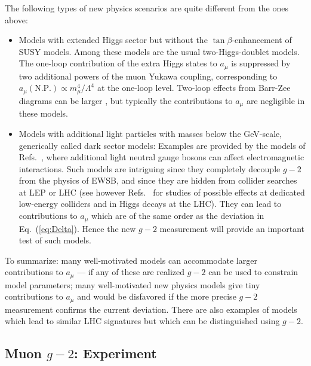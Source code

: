 %
The following types of new physics scenarios are quite different from
the ones above:
\begin{itemize}
\item Models with extended Higgs sector but without the
  $\tan\beta$-enhancement of SUSY models. Among these models are the
  usual two-Higgs-doublet models. The one-loop contribution
  of the extra Higgs states to $a_\mu$ is suppressed by two additional powers of
  the muon Yukawa coupling, corresponding to $a_\mu(\mbox{N.P.})\propto
  m_\mu^4/\Lambda^4$ at the one-loop level. Two-loop effects from
  Barr-Zee diagrams can be larger \cite{Krawczyk:2002df}, but typically the
  contributions to   $a_\mu$ are negligible in these models.
\item Models with additional light particles with masses below the
  GeV-scale, generically called dark sector models: Examples are
  provided by the  models of   Refs.\
  \cite{Pospelov:2008zw,Davoudiasl:2012qa}, where additional light
  neutral gauge bosons can affect electromagnetic interactions. Such
  models are intriguing since 
  they completely decouple $g-2$ from the physics of EWSB, and since
  they are hidden from collider searches at LEP or LHC (see however
  Refs.\ \cite{Essig:2009nc,Davoudiasl:2012ig} for studies of possible
  effects at dedicated low-energy colliders and in Higgs decays at the
  LHC). They can lead to
  contributions to $a_\mu$ which are of the same order as the deviation
  in Eq.~(\ref{eq:Delta}). Hence the new $g-2$ measurement will provide
  an important test of such models.
\end{itemize}
To summarize:
many well-motivated models can accommodate larger contributions to
$a_\mu$ --- if any of these are realized $g-2$ can be used to constrain
model parameters; many well-motivated new physics models
give tiny contributions to $a_\mu$ and would be disfavored if the
more precise $g-2$ measurement confirms the current deviation. There are also examples of models which lead to
similar LHC signatures but which can be distinguished using $g-2$.








\subsection{Muon $g-2$: Experiment}\label{sec:cl:g-2exp}


